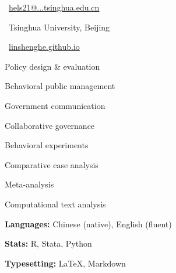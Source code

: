 \documentclass[11pt, a4paper]{awesome-cv}
\begin{document}
\makecvheader

\begin{cvsidebar}

\begin{cvitems}
  \item \faEnvelope\ \href{mailto:hels21@mails.tsinghua.edu.cn}{hels21@...tsinghua.edu.cn}
  \item \faMapMarker*\ Tsinghua University, Beijing
  \item \faGlobe\ \href{https://linshenghe.github.io}{linshenghe.github.io}
\end{cvitems}

\begin{cvitems}
  \item Policy design \& evaluation
  \item Behavioral public management
  \item Government communication
  \item Collaborative governance
\end{cvitems}

\begin{cvitems}
  \item Behavioral experiments
  \item Comparative case analysis
  \item Meta-analysis
  \item Computational text analysis
\end{cvitems}

\begin{cvitems}
  \item \textbf{Languages:} Chinese (native), English (fluent)
  \item \textbf{Stats:} R, Stata, Python
  \item \textbf{Typesetting:} \LaTeX, Markdown
\end{cvitems}

\end{cvsidebar}


\end{document}
